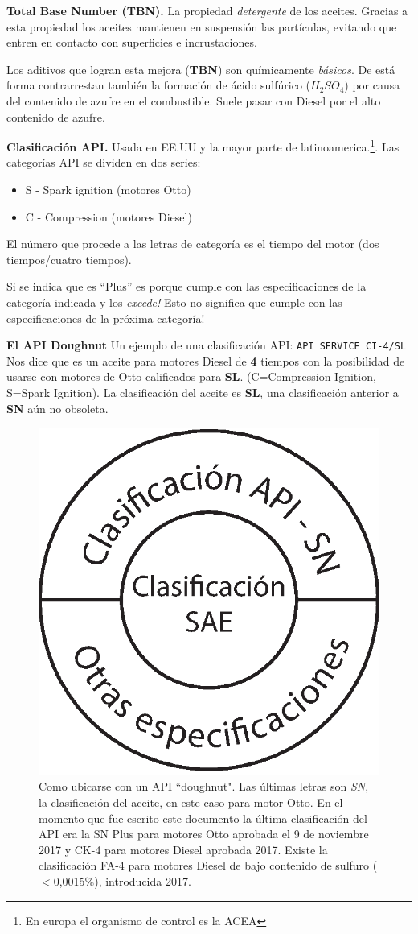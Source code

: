 {\bf Total Base Number (TBN).}
La propiedad \textit{detergente} de los aceites. Gracias a esta propiedad los aceites mantienen en suspensión las partículas, evitando que entren en contacto con superficies e incrustaciones.

Los aditivos que logran esta mejora (\textbf{TBN}) son químicamente \textit{básicos}. De está forma contrarrestan también la formación de ácido sulfúrico ($H_2SO_4$) por causa del contenido de azufre en el combustible. Suele pasar con Diesel por el alto contenido de azufre.

{\bf Clasificación API.}
Usada en EE.UU y la mayor parte de latinoamerica.\footnote{En europa el organismo de control es la ACEA}. Las categorías API se dividen en dos series:
\begin{itemize}
\item S - Spark ignition (motores Otto)
\item C - Compression (motores Diesel)
\end{itemize}
El número que procede a las letras de categoría es el tiempo del motor (dos tiempos/cuatro tiempos).
 
Si se indica que es ``Plus'' es porque cumple con las especificaciones de la categoría indicada y los \textit{excede!} Esto no significa que cumple con las especificaciones de la próxima categoría!

\textbf{El API Doughnut}
Un ejemplo de una clasificación API: \texttt{API SERVICE CI-4/SL} Nos dice que es un aceite para motores Diesel de \textbf{4} tiempos con la posibilidad de usarse con motores de Otto calificados para \textbf{SL}. (C=Compression Ignition, S=Spark Ignition). La clasificación del aceite es \textbf{SL}, una clasificación anterior a  \textbf{SN} aún no obsoleta.
\begin{figure}[htb!]
    \centering
    \includegraphics[width=.25\textwidth]{fig/api.eps}
    \caption{Como ubicarse con un API ``doughnut". Las últimas letras son \emph{SN}, la clasificación del aceite, en este caso para motor Otto. En el momento que fue escrito este documento la última clasificación del API era la SN Plus para motores Otto aprobada el 9 de noviembre 2017 y CK-4 para motores Diesel aprobada 2017. Existe la clasificación FA-4 para motores Diesel de bajo contenido de sulfuro ($<$0,0015\%), introducida 2017.}
    \label{fig:APIclasification}
\end{figure}

